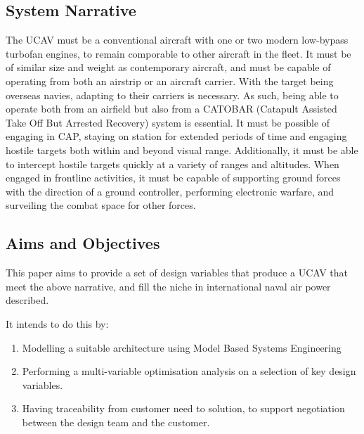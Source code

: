 \documentclass[../main.tex]{subfiles}
\begin{document}
\subsection{System Narrative}
The UCAV must be a conventional aircraft with one or two modern low-bypass turbofan engines, to remain comporable to other aircraft in the fleet.
It must be of similar size and weight as contemporary aircraft, and must be capable of operating from both an airstrip or an aircraft carrier.
With the target being overseas navies, adapting to their carriers is necessary.
As such, being able to operate both from an airfield but also from a CATOBAR (Catapult Assisted Take Off But Arrested Recovery) system is essential.
It must be possible of engaging in CAP, staying on station for extended periods of time and engaging hostile targets both within and beyond visual range.
Additionally, it must be able to intercept hostile targets quickly at a variety of ranges and altitudes.
When engaged in frontline activities, it must be capable of supporting ground forces with the direction of a ground controller, performing electronic warfare, and surveiling the combat space for other forces.


\subsection{Aims and Objectives}

This paper aims to provide a set of design variables that produce a UCAV that meet the above narrative, and fill the niche in international naval air power described.

It intends to do this by:

\begin{enumerate}
    \item Modelling a suitable architecture using Model Based Systems Engineering
    \item Performing a multi-variable optimisation analysis on a selection of key design variables.
    \item Having traceability from customer need to solution, to support negotiation between the design team and the customer.
\end{enumerate}
\end{document}
